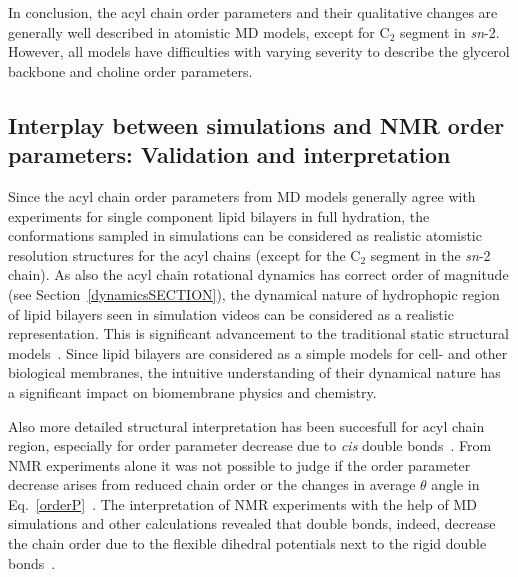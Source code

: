 \documentclass[aps,prl,superscriptaddress,twocolumn]{revtex4}
\begin{document}
In conclusion, the acyl chain order parameters and their qualitative changes are 
generally well described in atomistic MD models, except for C$_2$ segment in {\it sn}-2.
However, all models have difficulties with varying severity to describe the glycerol backbone
and choline order parameters.



\subsection{Interplay between simulations and NMR order parameters: Validation and interpretation}

Since the acyl chain order parameters from MD models generally 
agree with experiments for single component lipid bilayers in full hydration, 
the conformations sampled in simulations
can be considered as realistic atomistic resolution structures for 
the acyl chains (except for the C$_2$ segment in the {\it sn}-2 chain).
As also the acyl chain rotational dynamics has correct order of magnitude 
(see Section~\ref{dynamicsSECTION}), the dynamical nature of 
hydrophopic region of lipid bilayers seen in simulation videos
can be considered as a realistic representation. 
This is significant advancement to the traditional static structural 
models~\cite{seelig74,schindler75,seelig78,baenziger91}.
Since lipid bilayers are considered as a simple models for cell- and other 
biological membranes, the intuitive understanding of their dynamical nature 
has a significant impact on biomembrane physics and chemistry. 

Also more detailed structural interpretation has been succesfull for
acyl chain region, especially for order parameter decrease due to {\it cis} double
bonds~\cite{feller02,huber02,eldho03,stillwell03,gawrisch03,bachar04,ollila07a}.
From NMR experiments alone it was not possible to judge if 
the order parameter decrease arises from reduced chain order or the changes in 
average $\theta$ angle in Eq.~\ref{orderP}~\cite{??,stillwell03,gawrisch03}.
The interpretation of NMR experiments with the help of MD simulations and other calculations revealed that
double bonds, indeed, decrease the chain order due to the flexible dihedral
potentials next to the rigid double bonds~\cite{feller02,huber02,eldho03,stillwell03,gawrisch03,bachar04,ollila07a}.
\end{document}
